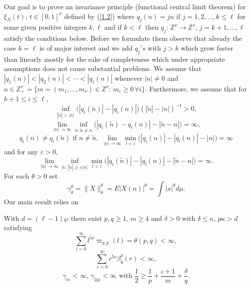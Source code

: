 Our goal is to prove an invariance principle (functional central limit theorem)
for $\xi_N(t),\, t\in [0,1]^\nu$ defined by (\ref{1.2}) where $q_j(n)=jn$ if
$j=1,2,...,k\leq\ell$ for some given positive integers $k,\ell$ and if $k<\ell$ then
 $q_j:\,{{\mathbb Z}}^\nu\to{{\mathbb Z}}^\nu,\, j=k+1,...,\ell$ satisfy the
conditions below. Before we formulate them observe that already the case $k=\ell$
is of major interest and we add $q_j's$ with $j>k$ which grow faster than linearly
mostly for the sake of completeness which under appropriate assumptions does 
not cause substantial problems.
We assume that $|q_1(n)|< |q_2(n)| <\cdots <|q_\ell(n)|$ whenever $|n|\ne 0$ 
and $n\in{{\mathbb Z}}_+^\nu=\{ m=(m_1,...,m_\nu)\in{{\mathbb Z}}^\nu:\, 
 m_i\geq 0\,\forall i\}$. Furthermore, we assume that for $k+1\le i \le \ell$,
 \begin{equation}\label{2.8-}
 \inf_{|\tilde n|>|n|}\big(|q_i(\tilde n)|-|q_i(n)|\big)(|\tilde n|-|n|)^{-1}
 >0,
 \end{equation}
\begin{equation}\label{2.8}
\lim_{|n|\to\infty}\inf_{\tilde n:\tilde n\ne n}\big(|q_i(\tilde n)-q_i(n)|-
|\tilde n-n|\big)=\infty,
\end{equation}
\begin{equation}\label{2.8+}
q_i(n)\ne q_i(\tilde n)\,\,\mbox{if}\,\, n\ne\tilde n,\,\,
\lim_{|n|\to\infty}\min_{l<i}\big(|q_i(n)|-|q_l(n)|-|n|\big)=\infty
\end{equation}
and for any ${{\varepsilon}} > 0$,
\begin{equation}\label{2.9}
\lim_{|n|\to\infty}\inf_{\tilde n:\, |\tilde n|\geq{{\varepsilon}} |n|}\min_{l<i}\big(
|q_{i}(\tilde n)|-|q_l(n)|-|\tilde n-n|\big)=\infty.
\end{equation}
For each $\theta>0$ set
\begin{equation}\label{2.10}
\gamma_\theta^\theta = \|X\|_\theta^\theta= E|X(n)|^\theta  =
\int |x|^\theta d\mu .
\end{equation}
Our main result relies on

\begin{assumption}\label{ass2.1} With $d=(\ell-1)\wp$ there exist $p,q\ge 1$,
 $m\geq 4$ and $\delta >0$ with   $ \delta \le {{\kappa}}$, $ p{{\kappa}}>d$ satisfying 
\begin{equation}\label{2.11}
\sum_{l=0}^\infty l^{5\nu}\varpi_{q,p}(l)={{\theta}}(p,q)<\infty,
\end{equation}
\begin{equation}\label{2.12}
\sum_{r=0}^\infty r^{5\nu}\beta^{{\delta}}_q( r)<\infty,
\end{equation}
\begin{equation}\label{2.13}
\gamma_{m}<\infty, \,\gamma_{2q\iota}<\infty\,\,\mbox{with}\,\,
 \frac{1}{2}\ge \frac{1}{p}+\frac{\iota+1}{m}+\frac{\delta}{q}.
 \end{equation}
 \end{assumption}
 
